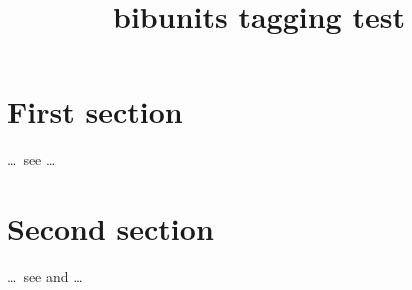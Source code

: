 \documentclass{article}
\title{bibunits tagging test}
\begin{document}
\section{First section}
\begin{bibunit}[plain]
\ldots\ see \cite*{inbook-full} \ldots
\putbib[xampl]
\end{bibunit}
\section{Second section}
\begin{bibunit}[alpha]
\ldots\ see \cite{phdthesis-full} and \cite{article-full} \ldots
\putbib[xampl]
\end{bibunit}


\end{document}
